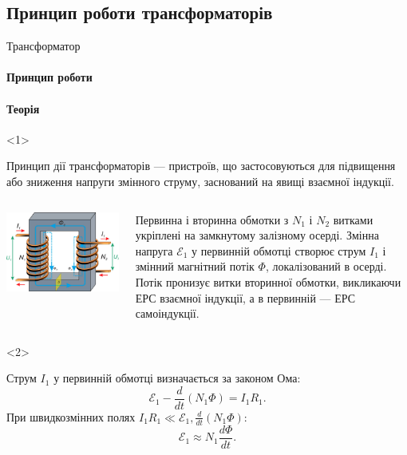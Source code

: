 \documentclass[onlytextwidth]{beamer}
\begin{document}
\subsection{Принцип роботи трансформаторів}


\begin{frame}{Трансформатор}{}
	\framesubtitle<1>{Принцип роботи}
	\framesubtitle<2>{Теорія}
	\begin{onlyenv}
		\begin{block}{}
			Принцип дії трансформаторів --- пристроїв, що застосовуються для підвищення або зниження напруги змінного струму, заснований на явищі взаємної індукції.
		\end{block}
		\begin{columns}
			\begin{column}{0.4\linewidth}\centering
				\includegraphics[width=0.85\linewidth]{Transformator}
			\end{column}
			\begin{column}{0.6\linewidth}
				\begin{block}{}\justifying
					Первинна і вторинна обмотки з $N_1$ і $N_2$ витками укріплені на замкнутому залізному осерді. Змінна напруга $\mathcal{E}_1$ у первинній
					обмотці створює струм $I_1$ і змінний магнітний потік $\Phi$, локалізований в осерді. Потік пронизує витки вторинної обмотки, викликаючи ЕРС
					взаємної індукції, а в первинній --- ЕРС самоіндукції.
				\end{block}
			\end{column}
		\end{columns}
	\end{onlyenv}
	\begin{onlyenv}
		\begin{block}{}\justifying
			Струм $I_1$ у первинній обмотці визначається за законом Ома:
			\begin{equation*}
				\mathcal{E}_1 - \frac{d}{dt}(N_1\Phi) = I_1R_1.
			\end{equation*}
			При швидкозмінних полях $I_1R_1 \ll \mathcal{E}_1, \frac{d}{dt}(N_1\Phi)$:
			\begin{equation*}
				\mathcal{E}_1 \approx N_1 \frac{d\Phi}{dt}.
			\end{equation*}


\end{block}
\end{onlyenv}
\end{frame}
\end{document}

